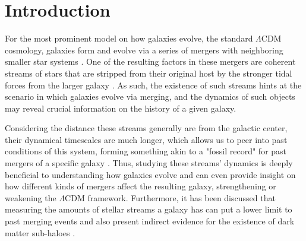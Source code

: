 \documentclass[linenumbers,trackchanges]{aastex7}
\begin{document}

\section{Introduction} \label{sec:introduction}

For the most prominent model on how galaxies evolve, the standard $\Lambda$CDM cosmology, galaxies form and evolve via a series of mergers with neighboring smaller star systems \citep{Johnston2008-bz}. One of the resulting factors in these mergers are coherent streams of stars that are stripped from their original host by the stronger tidal forces from the larger galaxy \citep{Jensen2021-mw}. As such, the existence of such streams hints at the scenario in which galaxies evolve via merging, and the dynamics of such objects may reveal crucial information on the history of a given galaxy.

Considering the distance these streams generally are from the galactic center, their dynamical timescales are much longer, which allows us to peer into past conditions of this system, forming something akin to a "fossil record" for past mergers of a specific galaxy \citep{Johnston1996-uv}. Thus, studying these streams' dynamics is deeply beneficial to understanding how galaxies evolve and can even provide insight on how different kinds of mergers affect the resulting galaxy, strengthening or weakening the $\Lambda$CDM framework. Furthermore, it has been discussed that measuring the amounts of stellar streams a galaxy has can put a lower limit to past merging events and also present indirect evidence for the existence of dark matter sub-haloes \citep{Malhan2018-mh}.
\end{document}
